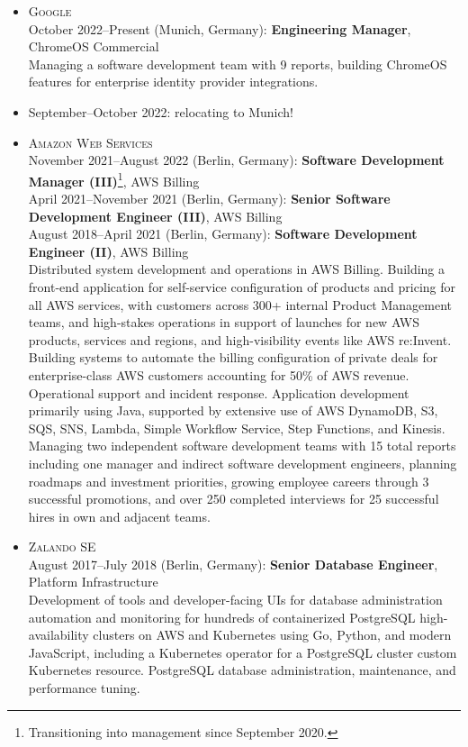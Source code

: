 \documentclass{res}
\begin{document}
\begin{resume}
\begin{itemize}[leftmargin=-0.3in]
    \item
      \textsc{Google}
      \\ October 2022--Present (Munich, Germany): \textbf{Engineering Manager}, ChromeOS Commercial
      \\ \small{Managing a software development team with 9 reports, building ChromeOS features for enterprise identity provider integrations.}

    \item September--October 2022: relocating to Munich!

    \item
      \textsc{Amazon Web Services}
      \\ November 2021--August 2022 (Berlin, Germany): \textbf{Software Development Manager (III)}\footnote{Transitioning into management since September 2020.}, AWS Billing
      \\ April 2021--November 2021 (Berlin, Germany): \textbf{Senior Software Development Engineer (III)}, AWS Billing
      \\ August 2018--April 2021 (Berlin, Germany): \textbf{Software Development Engineer (II)}, AWS Billing
      \\ \small{Distributed system development and operations in AWS Billing.  Building a front-end application for self-service configuration of products and pricing for all AWS services, with customers across 300+ internal Product Management teams, and high-stakes operations in support of launches for new AWS products, services and regions, and high-visibility events like AWS re:Invent.  Building systems to automate the billing configuration of private deals for enterprise-class AWS customers accounting for 50\% of AWS revenue.  Operational support and incident response.  Application development primarily using Java, supported by extensive use of AWS DynamoDB, S3, SQS, SNS, Lambda, Simple Workflow Service, Step Functions, and Kinesis.}
      \\ \small{Managing two independent software development teams with 15 total reports including one manager and indirect software development engineers, planning roadmaps and investment priorities, growing employee careers through 3 successful promotions, and over 250 completed interviews for 25 successful hires in own and adjacent teams.}

    \item
      \textsc{Zalando SE}
      \\ August 2017--July 2018 (Berlin, Germany): \textbf{Senior Database Engineer}, Platform Infrastructure
      \\ \small{Development of tools and developer-facing UIs for database administration automation and monitoring for hundreds of containerized PostgreSQL high-availability clusters on AWS and Kubernetes using Go, Python, and modern JavaScript, including a Kubernetes operator for a PostgreSQL cluster custom Kubernetes resource. PostgreSQL database administration, maintenance, and performance tuning.}


\end{itemize}
\end{resume}
\end{document}
